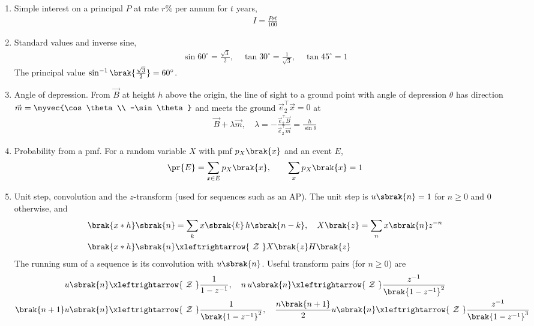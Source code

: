 \begin{enumerate}[label=\thesubsection.\arabic*, ref=\thesubsection.\theenumi]
and the solution is unique when this common rank equals $n$.
\item Simple interest on a principal $P$ at rate $r\%$ per annum for $t$ years,
\begin{align}
	I = \frac{Prt}{100} \label{eq:CBSE25S2-interest}
\end{align}
\item Standard values and inverse sine,
\begin{align}
	\sin 60^\circ = \frac{\sqrt{3}}{2}, \quad \tan 30^\circ = \frac{1}{\sqrt{3}}, \quad \tan 45^\circ = 1 \label{eq:CBSE25S2-trig}
\end{align}
The principal value $\sin^{-1}\brak{\frac{\sqrt{3}}{2}} = 60^\circ$.
\item Angle of depression. From $\vec{B}$ at height $h$ above the origin, the line of sight to a ground point with angle of depression $\theta$ has direction $\vec{m} = \myvec{\cos\theta \\ -\sin\theta}$ and meets the ground $\vec{e}_2^{\top}\vec{x} = 0$ at
\begin{align}
	\vec{B} + \lambda\vec{m}, \quad \lambda = -\frac{\vec{e}_2^{\top}\vec{B}}{\vec{e}_2^{\top}\vec{m}} = \frac{h}{\sin\theta} \label{eq:CBSE25S2-depression}
\end{align}
\item Probability from a pmf. For a random variable $X$ with pmf $p_X\brak{x}$ and an event $E$,
\begin{align}
	\pr{E} = \sum_{x \in E} p_X\brak{x}, \qquad \sum_{x} p_X\brak{x} = 1 \label{eq:CBSE25S2-pmf}
\end{align}
\item Unit step, convolution and the $z$-transform (used for sequences such as an AP). The unit step is $u\sbrak{n} = 1$ for $n \ge 0$ and $0$ otherwise, and
\begin{align}
	\brak{x * h}\sbrak{n} &= \sum_{k} x\sbrak{k}\,h\sbrak{n-k}, \quad
	X\brak{z} = \sum_{n} x\sbrak{n}z^{-n}
	\\
	\brak{x*h}\sbrak{n} &\xleftrightarrow{\ \mathcal{Z}\ } X\brak{z}H\brak{z} \label{eq:CBSE25S2-conv}
\end{align}
The running sum of a sequence is its convolution with $u\sbrak{n}$. Useful transform pairs (for $n \ge 0$) are
\begin{align}
	u\sbrak{n} &\xleftrightarrow{\ \mathcal{Z}\ } \frac{1}{1 - z^{-1}}, \quad
	n\,u\sbrak{n} \xleftrightarrow{\ \mathcal{Z}\ } \frac{z^{-1}}{\brak{1 - z^{-1}}^2}
	\\
	\brak{n+1}u\sbrak{n} &\xleftrightarrow{\ \mathcal{Z}\ } \frac{1}{\brak{1 - z^{-1}}^2}, \quad
	\frac{n\brak{n+1}}{2}u\sbrak{n} \xleftrightarrow{\ \mathcal{Z}\ } \frac{z^{-1}}{\brak{1 - z^{-1}}^3} \label{eq:CBSE25S2-pairs}
\end{align}
\end{enumerate}
